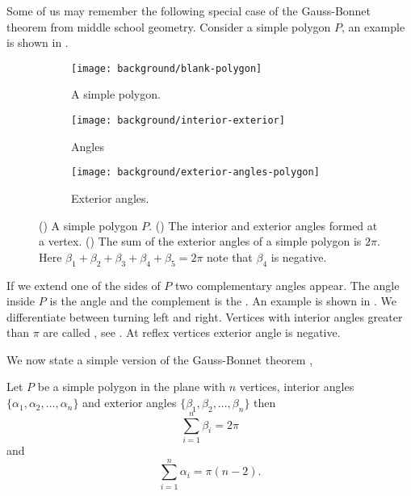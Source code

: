Some of us may remember the following special case
of the Gauss-Bonnet theorem from middle school geometry.
Consider a simple polygon $P$, an example is shown in .

 \begin{figure}[htb]
         \centering
          \begin{subfigure}[b]{0.30\textwidth}
      		   \texttt{[image: background/blank-polygon]}
    		    \caption{A simple polygon.}
 		 \label{fig:polygon}
	 \end{subfigure}
	 \hspace{.5cm}
	 \begin{subfigure}[b]{0.25\textwidth}
       		  \texttt{[image: background/interior-exterior]}
     		    \caption{Angles}
 		 \label{fig:interior-exterior}
       \end{subfigure}
        \hspace{.5cm}
     \begin{subfigure}[b]{0.27\textwidth}
       		  \texttt{[image: background/exterior-angles-polygon]}
       		  \caption{Exterior angles.}
       		   \label{fig:exterior-angles}
         \end{subfigure}
		\caption{() A simple polygon $P.$
		() The interior and exterior angles formed at a vertex.
 		 () The sum of the exterior angles of a simple
		polygon is $2\pi$. Here
		$\beta_1+\beta_2+\beta_3+\beta_4+\beta_5=2\pi$ note that $\beta_4$ is negative.
 		\label{fig:simple-polygon}}
 \end{figure}

If we extend one of the sides of $P$ two complementary angles appear.
The angle inside $P$ is the  angle and the complement 
is the  . An example is shown in .
We differentiate between turning left and right.
Vertices with interior angles  greater than $\pi$ are called , see . 
At reflex vertices exterior angle is negative.



We now state a simple version of the Gauss-Bonnet theorem \cite{gottlieb_all_1996,polya_elementary_1954},

\begin{theorem}\label{thm:simple-bonnet}
Let $P$ be a simple polygon in the plane with $n$  vertices,
interior angles $\{\alpha_1,\alpha_2,\ldots,\alpha_n\}$
and exterior angles $\{\beta_1,\beta_2,\ldots,\beta_n\}$ then
$$\sum_{i=1}^n\beta_i=2\pi$$
and 
$$\sum_{i=1}^n\alpha_i=\pi(n-2).$$
\end{theorem}


